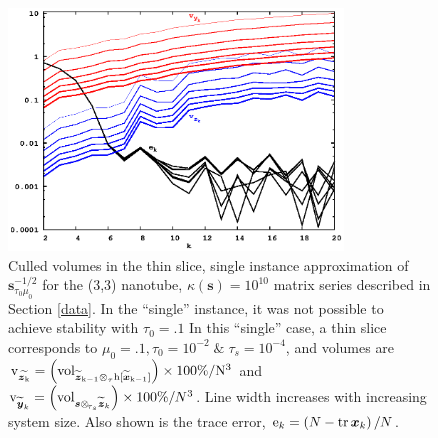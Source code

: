 \documentclass[letterpaper,twocolumn,amsmath,amsfont,amssymb,english,aps,jcp,preprintnumbers,groupaddress,nofootinbib,tightenlines,floatfix]{revtex4}
\newcommand{\mat}[1]{\boldsymbol{#1}}
\newcommand{\ot}{  {\scriptstyle \otimes}_{ \tau } }
\newcommand{\ots}{ {\scriptstyle \otimes}_{ \! \tau_s } }
\theoremstyle{plain}
\theoremstyle{remark}
\theoremstyle{plain}
\begin{document}
\begin{figure}[h]
 \includegraphics[width=3.5in]{fig_33_tube_cond_10_regularized/33_tube_k10_regularized_stab.eps}
\caption{
Culled volumes in the thin slice, single instance approximation of $\mat{s}^{-1/2}_{\tau_0 \mu_0}$
for the (3,3) nanotube, $\kappa(\mat{s})=10^{10}$ matrix series 
described in Section \ref{data}.  In the ``single'' instance, it was not possible to achieve stability with $\tau_0=.1$
In this ``single'' case, a thin slice corresponds to $\mu_0=.1, \tau_0=10^{-2} \;  \&  \; \tau_s=10^{-4}$, and volumes are
$\rm v_{\widetilde{\mat{z}_k}} = \left( {\rm vol}_{ \widetilde{\mat{z}}_{k-1}\ot h[\widetilde{\mat{x}}_{k-1}] } \right) \times 100\% /N^3$ and
${\rm v}_{\widetilde{\mat{y}}_k} = \left( {\rm vol}_{\mat{s}  \ots  \widetilde{\mat{z}}_{k}} \right) \times 100\% /N^3$.    
Line width increases with increasing system size. 
Also shown is the trace error, ${\rm e}_{k} = \left( N-{\rm tr}\,\mat{x}_k \right)/N$.}\label{regularized_stab}
\end{figure} 
\end{document}

